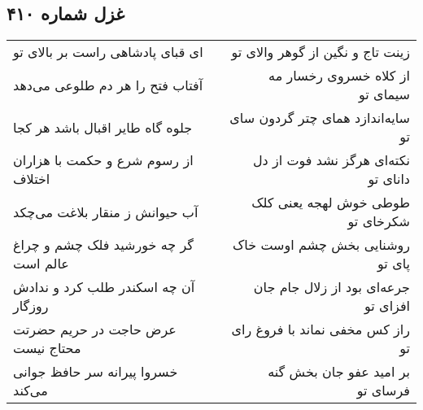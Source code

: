 \begin{center}
\section*{غزل شماره ۴۱۰}
\label{sec:sh410}
\begin{longtable}{l p{0.5cm} r}
ای قبای پادشاهی راست بر بالای تو
&&
زینت تاج و نگین از گوهر والای تو
\\
آفتاب فتح را هر دم طلوعی می‌دهد
&&
از کلاه خسروی رخسار مه سیمای تو
\\
جلوه گاه طایر اقبال باشد هر کجا
&&
سایه‌اندازد همای چتر گردون سای تو
\\
از رسوم شرع و حکمت با هزاران اختلاف
&&
نکته‌ای هرگز نشد فوت از دل دانای تو
\\
آب حیوانش ز منقار بلاغت می‌چکد
&&
طوطی خوش لهجه یعنی کلک شکرخای تو
\\
گر چه خورشید فلک چشم و چراغ عالم است
&&
روشنایی بخش چشم اوست خاک پای تو
\\
آن چه اسکندر طلب کرد و ندادش روزگار
&&
جرعه‌ای بود از زلال جام جان افزای تو
\\
عرض حاجت در حریم حضرتت محتاج نیست
&&
راز کس مخفی نماند با فروغ رای تو
\\
خسروا پیرانه سر حافظ جوانی می‌کند
&&
بر امید عفو جان بخش گنه فرسای تو
\\
\end{longtable}
\end{center}
